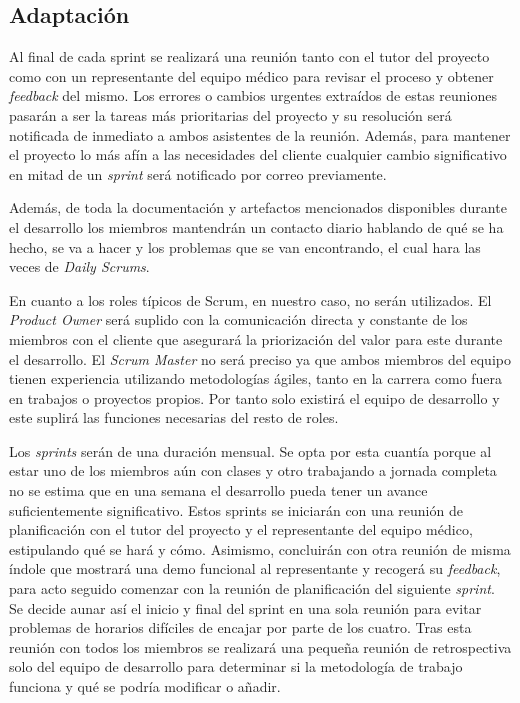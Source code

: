      \subsection{Adaptación}
    Al final de cada sprint se realizará una reunión tanto con el tutor del proyecto como con un representante del equipo médico para revisar el proceso y obtener \textit{feedback} del mismo. Los errores o cambios urgentes extraídos de estas reuniones pasarán a ser la tareas más prioritarias del proyecto y su resolución será notificada de inmediato a ambos asistentes de la reunión. Además, para mantener el proyecto lo más afín a las necesidades del cliente cualquier cambio significativo en mitad de un \textit{sprint} será notificado por correo previamente.
    \newline
    
    Además, de toda la documentación y artefactos mencionados disponibles durante el desarrollo los miembros mantendrán un contacto diario hablando de qué se ha hecho, se va a hacer y los problemas que se van encontrando, el cual hara las veces de \textit{Daily Scrums}.\newline

	En cuanto a los roles típicos de Scrum, en nuestro caso, no serán utilizados. El \textit{Product Owner} será suplido con la comunicación directa y constante  de los miembros con el cliente que asegurará la priorización del valor para este durante el desarrollo. El \textit{Scrum Master} no será preciso ya que ambos miembros del equipo tienen experiencia utilizando metodologías ágiles, tanto en la carrera como fuera en trabajos o proyectos propios. Por tanto solo existirá el equipo de desarrollo y este suplirá las funciones necesarias del resto de roles.\newline

	Los \textit{sprints} serán de una duración mensual. Se opta por esta cuantía porque al estar uno de los miembros aún con clases y otro trabajando a jornada completa no se estima que en una semana el desarrollo pueda tener un avance suficientemente significativo. Estos sprints se iniciarán con una reunión de planificación con el tutor del proyecto y el representante del equipo médico, estipulando qué se hará y cómo. Asimismo, concluirán con otra reunión de misma índole que mostrará una demo funcional al representante y recogerá su \textit{feedback}, para acto seguido comenzar con la reunión de planificación del siguiente \textit{sprint}. Se decide aunar así el inicio y final del sprint en una sola reunión para evitar problemas de horarios difíciles de encajar por parte de los cuatro. Tras esta reunión con todos los miembros se realizará una pequeña reunión de retrospectiva solo del equipo de desarrollo para determinar si la metodología de trabajo funciona y qué se podría modificar o añadir.\newline

